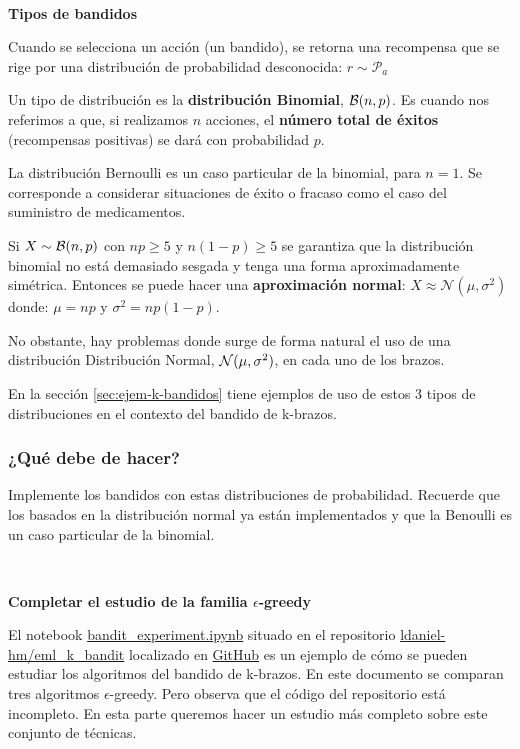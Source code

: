 \documentclass[a4paper, 11pt]{article}
\begin{document}
\

\centerline{\textbf{Tipos de bandidos}} 

Cuando se selecciona un acción (un bandido), se retorna una recompensa que se rige por una distribución de probabilidad desconocida: \( r \sim \mathcal{P}_{a} \)

Un tipo de distribución es la \textbf{distribución Binomial}, ${\cal B}(n,p)$. Es cuando nos referimos a que, si realizamos $n$ acciones, el \textbf{número total de éxitos} (recompensas positivas) se dará con probabilidad $p$. 

La distribución Bernoulli es un caso particular de la binomial, para $n=1$. Se corresponde a considerar situaciones de éxito o fracaso como el caso del suministro de medicamentos.



Si $X\sim {\cal B}(n,p)$ con $np\geq 5$ y $n(1-p)\geq 5$ se garantiza que la distribución binomial no está demasiado sesgada y tenga una forma aproximadamente simétrica.
Entonces se puede hacer una \textbf{aproximación normal}:
$
X \approx \mathcal{N}(\mu, \sigma^2)
$
donde:  \( \mu = n p \) y \( \sigma^2 = n p (1 - p) \). 

No obstante, hay problemas donde surge de forma natural el uso de una distribución Distribución Normal, ${\cal N}(\mu, \sigma^2)$, en cada uno de los brazos. 


En la sección \ref{sec:ejem-k-bandidos} tiene ejemplos de uso de estos 3 tipos de distribuciones en el contexto del bandido de k-brazos.



\subsubsection*{¿Qué debe de hacer?}

Implemente los bandidos con estas distribuciones de probabilidad.  Recuerde que los basados en la distribución normal ya están implementados y que la Benoulli es un caso particular de la binomial. 

 
\

\centerline{\textbf{Completar el estudio de la familia $\epsilon$-greedy}} 

 
El notebook \href{https://githubtocolab.com/ldaniel-hm/eml_k_bandit/blob/main/bandit_experiment.ipynb}{bandit\_experiment.ipynb} situado en el repositorio \href{https://github.com/ldaniel-hm/eml_k_bandit}{ldaniel-hm/eml\_k\_bandit} localizado en \href{https://github.com/ldaniel-hm/}{GitHub} es un ejemplo de cómo se pueden estudiar los algoritmos del bandido de k-brazos. En este documento se comparan tres algoritmos $\epsilon$-greedy. Pero observa que el código del repositorio está incompleto. En esta parte queremos hacer un estudio más completo sobre este conjunto de técnicas. 
\end{document}
